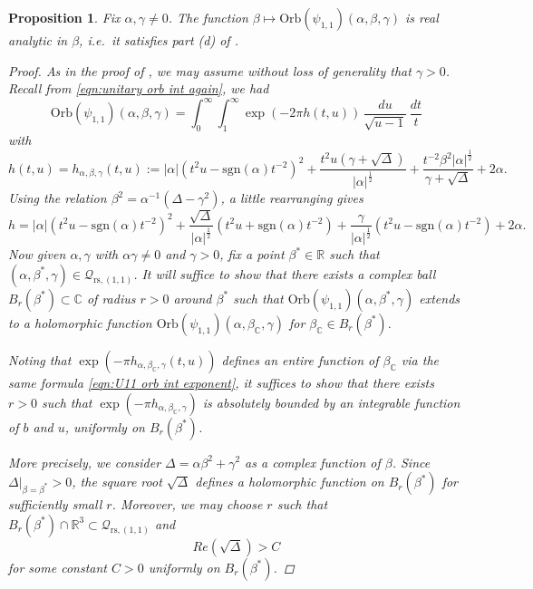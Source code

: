 \documentclass[reqno, 11pt]{amsart} %
\numberwithin{equation}{section}
\theoremstyle{plain}
\newtheorem{proposition}[theorem]{Proposition}
\theoremstyle{definition}
\theoremstyle{remark}
\newcommand{\mr}{\mathrm}
\newcommand{\rs}{\mr{rs}}
\newcommand{\bbC}{\mathbb C}
\newcommand{\bbR}{\mathbb R}
\newcommand{\calQ}{\mathcal Q}
\newcommand{\Orb}{\mathrm{Orb}}
\begin{document}
\begin{proposition}\label{prop:analytic_U}
Fix $\alpha , \gamma \neq 0$. The function $\beta \mapsto \Orb(ψ_{1,1})(\alpha,\beta,\gamma)$ is real analytic in $\beta$, i.e.\ it satisfies part (d) of .
\begin{proof}
As in the proof of , we may assume without loss of generality that $\gamma > 0$.
Recall from \eqref{eqn:unitary orb int again}, we had
\[
\Orb(\psi_{1,1})(\alpha,\beta,\gamma) =     \int_0^{\infty} \int_{1}^{\infty} 		 \exp \left(-2\pi h(t,u) \right)  \,\frac{du}{\sqrt{u-1}}\, \frac{dt}t
\]
with
\begin{equation*}
h(t,u) = h_{\alpha,\beta,\gamma}(t,u) :=  |\alpha|( t^2  u - \mathrm{sgn}(\alpha)t^{-2} )^2 + \frac{t^2u(\gamma+ \sqrt{\Delta})}{|\alpha|^\frac12}  + \frac{t^{-2} \beta^2 |\alpha|^{\frac12}}{\gamma+ \sqrt{\Delta}}   + 2 \alpha.
\end{equation*}
Using the relation $ \beta^2 = \alpha^{-1} (\Delta - \gamma^2)$, a little rearranging gives
\[
h =  |\alpha| ( t^2  u - \mathrm{sgn}(\alpha)t^{-2} )^2  +  \frac{\sqrt{\Delta}}{|\alpha|^{\frac12}} (t^2 u + \mathrm{sgn}(\alpha) t^{-2}) + \frac{\gamma}{|\alpha|^{\frac12}} (t^2 u - \mathrm{sgn}(\alpha)t^{-2}) + 2 \alpha.
\]
Now given $\alpha, \gamma$ with $\alpha\gamma \neq 0$ and $\gamma>0$, fix a point $\beta^* \in \mathbb R$ such that $(\alpha, \beta^*, \gamma) \in \mathcal Q_{\rs, (1,1)}$.  It will suffice to show that there exists a complex ball $B_{r}(\beta^*)\subset \bbC$ of radius $r>0$ around $\beta^*$ such that $	\Orb(\psi_{1,1})(\alpha, \beta^*, \gamma) $ extends to a holomorphic function $\Orb(\psi_{1,1})(\alpha, \beta_{\mathbb C}, \gamma)$ for $\beta_{\bbC} \in B_{r}(\beta^*)$.

Noting that $\exp(- \pi h_{\alpha, \beta_{\mathbb C}, \gamma}(t,u))$ defines an entire function of $\beta_{\bbC}$ via the same formula \eqref{eqn:U11 orb int exponent}, it suffices to show that there exists $r>0$ such that $\exp(- \pi h_{\alpha, \beta_{\mathbb C}, \gamma})$ is absolutely bounded by an integrable function of $b$ and $u$, uniformly on $B_{r}(\beta^*)$.

More precisely, we consider $\Delta = \alpha \beta^2 + \gamma^2$ as a complex function of $\beta$. Since $\Delta|_{\beta = \beta^*} > 0$, the square root $\sqrt{\Delta}$ defines a holomorphic function on $B_r(\beta^*)$ for sufficiently small $r$. Moreover, we may choose $r$ such that  $B_r(\beta^*) \cap \bbR^3 \subset \calQ_{\rs, (1,1)} $ and
\[
Re(\sqrt{\Delta}) > C
\]
for some constant $C>0 $ uniformly on $B_r(\beta^*)$.


\end{proof}
\end{proposition}
\end{document}
